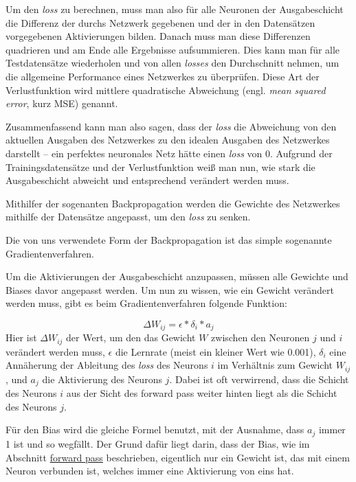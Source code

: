 \documentclass[10pt]{article}
\newcommand{\threesub}[1]{
    \vspace{1.5ex}
    \noindent {\textbf{#1}}
    \vspace{0.5ex}
}
\newcommand{\form}[1]{#1}
\newcommand{\eng}[1]{\textit{#1}}
\newcommand{\feng}[1]{{#1}}
\begin{document}
Um den \eng{loss} zu berechnen, muss man also für alle Neuronen der Ausgabeschicht die Differenz der durchs Netzwerk gegebenen und der in den Datensätzen vorgegebenen Aktivierungen bilden. Danach muss man diese Differenzen quadrieren und am Ende alle Ergebnisse aufsummieren. Dies kann man für alle Testdatensätze wiederholen und von allen \eng{losses} den Durchschnitt nehmen, um die allgemeine Performance eines Netzwerkes zu überprüfen. Diese Art der Verlustfunktion wird mittlere quadratische Abweichung (engl. \eng{mean squared error}, kurz MSE) genannt.
	
Zusammenfassend kann man also sagen, dass der \eng{loss} die Abweichung von den aktuellen Ausgaben des Netzwerkes zu den idealen Ausgaben des Netzwerkes darstellt -- ein perfektes neuronales Netz hätte einen \eng{loss} von 0. Aufgrund der Trainingsdatensätze und der Verlustfunktion weiß man nun, wie stark die Ausgabeschicht abweicht und entsprechend verändert werden muss.

\threesub{Backpropagation}

Mithilfer der sogenanten Backpropagation werden die Gewichte des Netzwerkes mithilfe der Datensätze angepasst, um den \eng{loss} zu senken.

Die von uns verwendete Form der Backpropagation ist das simple sogenannte Gradientenverfahren.

Um die Aktivierungen der Ausgabeschicht anzupassen, müssen alle Gewichte und Biases davor angepasst werden. Um nun zu wissen, wie ein Gewicht verändert werden muss, gibt es beim Gradientenverfahren folgende Funktion:

\form{\[
	\Delta W_{ij} = \epsilon * \delta_i * a_j
\]}
%
Hier ist  $\Delta W_{ij}$ der Wert, um den das Gewicht $W$ zwischen den Neuronen $j$ und $i$ verändert werden muss, $\epsilon$ die Lernrate (meist ein kleiner Wert wie 0.001), $\delta_i$ eine Annäherung der Ableitung des \eng{loss} des Neurons $i$ im Verhältnis zum Gewicht $W_{ij}$, und $a_j$ die Aktivierung des Neurons $j$. Dabei ist oft verwirrend, dass die Schicht des Neurons $i$ aus der Sicht des \feng{forward pass} weiter hinten liegt als die Schicht des Neurons $j$.
	

Für den Bias wird die gleiche Formel benutzt, mit der Ausnahme, dass $a_j$ immer 1 ist und so wegfällt. Der Grund dafür liegt darin, dass der Bias, wie im Abschnitt \hyperref[forward-prop]{\feng{forward pass}} beschrieben, eigentlich nur ein Gewicht ist, das mit einem Neuron verbunden ist, welches immer eine Aktivierung von eins hat.
\end{document}
